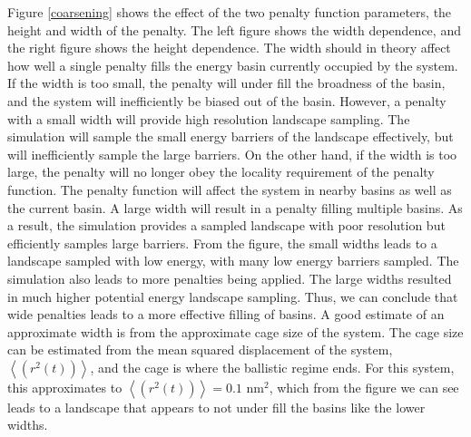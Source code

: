 Figure \ref{coarsening} shows the effect of the two penalty function parameters, the height and width of the penalty.  The left figure shows the width dependence, and the right figure shows the height dependence.  The width should in theory affect how well a single penalty fills the energy basin currently occupied by the system.  If the width is too small, the penalty will under fill the broadness of the basin, and the system will inefficiently be biased out of the basin.  However, a penalty with a small width will provide high resolution landscape sampling.  The simulation will sample the small energy barriers of the landscape effectively, but will inefficiently sample the large barriers.  On the other hand, if the width is too large, the penalty will no longer obey the locality requirement of the penalty function.  The penalty function will affect the system in nearby basins as well as the current basin.  A large width will result in a penalty filling multiple basins.  As a result, the simulation provides a sampled landscape with poor resolution but efficiently samples large barriers.  From the figure, the small widths leads to a landscape sampled with low energy, with many low energy barriers sampled.  The simulation also leads to more penalties being applied.  The large widths resulted in much higher potential energy landscape sampling.  Thus, we can conclude that wide penalties leads to a more effective filling of basins.  A good estimate of an approximate width is from the approximate cage size of the system.  The cage size can be estimated from the mean squared displacement of the system, $\left<(r^2(t))\right>$, and the cage is where the ballistic regime ends.  For this system, this approximates to $\left<(r^2(t))\right> = 0.1$ nm$^2$, which from the figure we can see leads to a landscape that appears to not under fill the basins like the lower widths.  

